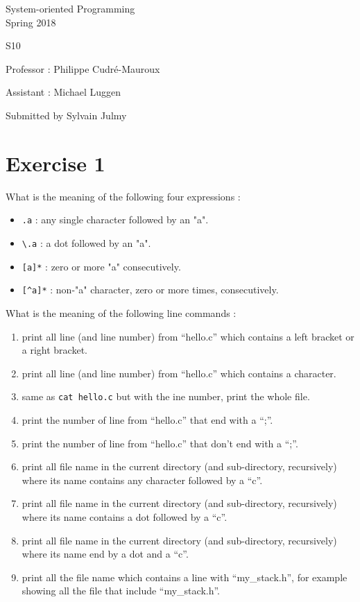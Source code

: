 \documentclass[a4paper,11pt]{report}
\author{Sylvain Julmy}
\date{\today}
\begin{document}
\begin{center}
  \Large{
    System-oriented Programming\\
    Spring 2018
  }
  
  \noindent\makebox[\linewidth]{\rule{\linewidth}{0.4pt}}
  S10
  \noindent\makebox[\linewidth]{\rule{\linewidth}{0.4pt}}

  \begin{flushleft}
    Professor : Philippe Cudré-Mauroux

    Assistant : Michael Luggen
  \end{flushleft}
  
  \noindent\makebox[\linewidth]{\rule{\linewidth}{0.4pt}}

  Submitted by Sylvain Julmy
  
  \noindent\makebox[\linewidth]{\rule{\textwidth}{1pt}}
\end{center}

\section*{Exercise 1}

What is the meaning of the following four expressions :
\begin{itemize}
\item \verb+.a+ : any single character followed by an "a".
\item \verb+\.a+ : a dot followed by an "a".
\item \verb+[a]*+ : zero or more "a" consecutively.
\item \verb+[^a]*+ : non-"a" character, zero or more times, consecutively.
\end{itemize}

What is the meaning of the following line commands :
\begin{enumerate}
\item print all line (and line number) from ``hello.c'' which contains a left bracket or a right
  bracket.
\item print all line (and line number) from ``hello.c'' which contains a character.
\item same as \verb+cat hello.c+ but with the ine number, print the whole file.
\item print the number of line from ``hello.c'' that end with a ``;''.
\item print the number of line from ``hello.c'' that don't end with a ``;''.
\item print all file name in the current directory (and sub-directory,
  recursively) where its name contains any character followed by a ``c''.
\item print all file name in the current directory (and sub-directory,
  recursively) where its name contains a dot followed by a ``c''.
\item print all file name in the current directory (and sub-directory,
  recursively) where its name end by a dot and a ``c''.
\item print all the file name which contains a line with ``my\_stack.h'', for
  example showing all the file that include ``my\_stack.h''.
\end{enumerate}
\end{document}
